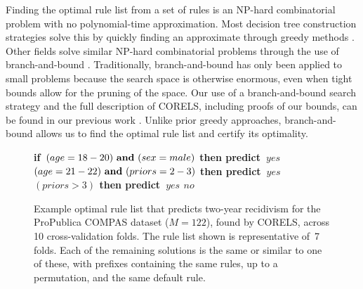 \documentclass[format=sigconf]{acmart}
\def\bif{\bf if~}
\def\belif{{\bf else if~}}
\def\bthen{{\bf then predict~}}
\def\belse{{\bf else predict~}}
\def \band{{\bf ~and~}}
\begin{document}
Finding the optimal rule list from a set of rules is an NP-hard combinatorial problem with no polynomial-time approximation.
Most decision tree construction strategies solve this by quickly finding an approximate through greedy  methods \citep{BreimanFrOlSt84, Quinlan93}.
Other fields solve similar NP-hard combinatorial problems through the use of branch-and-bound \citep{Clausen99}.
Traditionally, branch-and-bound has only been applied to small problems because the search space is otherwise enormous, even when tight bounds allow for the pruning of the space.
Our use of a branch-and-bound search strategy and the full description of CORELS, including proofs of our bounds, can be found in our previous work \cite{AngelinoLaAlSeRu17, ErtekinRu17}.
Unlike prior greedy approaches, branch-and-bound allows us to find the optimal rule list and certify its optimality.

\begin{figure}[ht!]
\vspace{2mm}
\begin{algorithmic}
\State \bif $(age = 18-20) \band (sex = male)$ \bthen $yes$
\State \belif $(age = 21-22) \band (priors = 2-3)$ \bthen $yes$
\State \belif $(priors > 3)$ \bthen $yes$
\State \belse $no$
\end{algorithmic}
\caption{Example optimal rule list that predicts two-year recidivism for the ProPublica COMPAS dataset (${M=122}$), found by CORELS, across 10 cross-validation folds.
%
The rule list shown is representative of~7 folds.
Each of the remaining solutions is the same or similar to one of these, with prefixes containing the same rules, up to a permutation, and the same default rule.
}
\label{fig:recidivism}
\end{figure}
\end{document}
